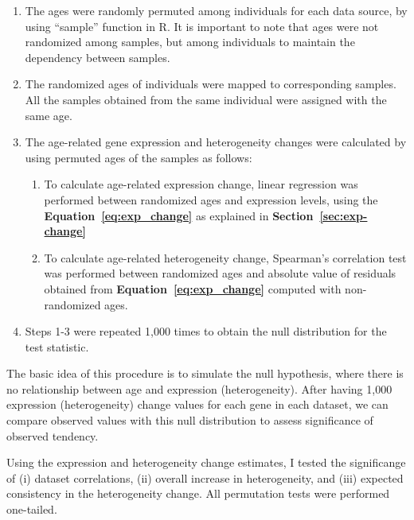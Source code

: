\begin{enumerate}
    \item The ages were randomly permuted among individuals for each data source, by using ``sample'' function in R. 
    It is important to note that ages were not randomized among samples, but among individuals to maintain the dependency between samples.
    \item The randomized ages of individuals were mapped to corresponding samples. All the samples obtained from the same individual were assigned with the same age.
    \item The age-related gene expression and heterogeneity changes were calculated by using permuted ages of the samples as follows:
    \begin{enumerate}
        \item To calculate age-related expression change, linear regression was performed between randomized ages and expression levels, using the \textbf{Equation~\ref{eq:exp_change}} as explained in \textbf{Section~\ref{sec:exp-change}}
        \item To calculate age-related heterogeneity change, Spearman's correlation test was performed between randomized ages and absolute value of residuals obtained from \textbf{Equation~\ref{eq:exp_change}} computed with non-randomized ages.
    \end{enumerate} 
    \item Steps 1-3 were repeated 1,000 times to obtain the null distribution for the test statistic.
\end{enumerate}

The basic idea of this procedure is to simulate the null hypothesis, where there is no relationship between age and expression (heterogeneity).
After having 1,000 expression (heterogeneity) change values for each gene in each dataset, we can compare observed values with this null distribution
to assess significance of observed tendency. 

Using the expression and heterogeneity change estimates, I tested the significange of 
(i) dataset correlations, (ii) overall increase in heterogeneity, and (iii) expected consistency in the heterogeneity change.
All permutation tests were performed one-tailed.

